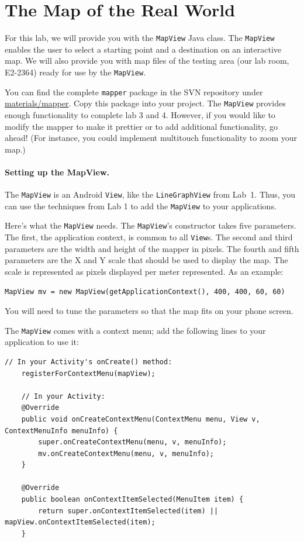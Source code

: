 \documentclass[10pt]{article}
\begin{document}
\section{The Map of the Real World}
For this lab, we will provide you with the {\tt MapView} Java class. The {\tt MapView} enables the user to select a starting point and a destination on an interactive map. We will also provide you with map files of the testing area (our lab room, E2-2364) ready for use by the {\tt MapView}. 

You can find the complete {\tt mapper} package in the SVN repository under \url{materials/mapper}. Copy this package into your project. The {\tt MapView} provides enough functionality to complete lab 3 and 4. However, if you would like to modify the mapper to make it prettier or to add additional functionality, go ahead! (For instance, you could implement multitouch functionality to zoom your map.)

\paragraph{Setting up the MapView.} The {\tt MapView} is an Android {\tt View}, like the {\tt LineGraphView} from Lab~1. Thus, you can use the techniques from Lab 1 to add the {\tt MapView} to your applications. 

Here's what the {\tt MapView} needs.
The {\tt MapView}'s constructor takes five parameters. The first, the application context, is common to all {\tt View}s. The second and third parameters are the width and height of the mapper in pixels. The fourth and fifth parameters are the X and Y scale that should be used to display the map. The scale is represented as pixels displayed per meter represented. As an example:

\begin{lstlisting}[basicstyle=\ttfamily\small]
    MapView mv = new MapView(getApplicationContext(), 400, 400, 60, 60)
\end{lstlisting}
\vspace*{-1em}
You will need to tune the parameters so that the map fits on your phone screen.

The {\tt MapView} comes with a context menu; add the following lines to your application to use it: 

\begin{lstlisting}[basicstyle=\ttfamily\small]
    // In your Activity's onCreate() method:
    registerForContextMenu(mapView);

    // In your Activity:
    @Override
    public void onCreateContextMenu(ContextMenu menu, View v, ContextMenuInfo menuInfo) {
    	super.onCreateContextMenu(menu, v, menuInfo);
    	mv.onCreateContextMenu(menu, v, menuInfo);
    }

    @Override
    public boolean onContextItemSelected(MenuItem item) {
    	return super.onContextItemSelected(item) || mapView.onContextItemSelected(item);
    }
\end{lstlisting}
\vspace*{-2em}
\end{document}
